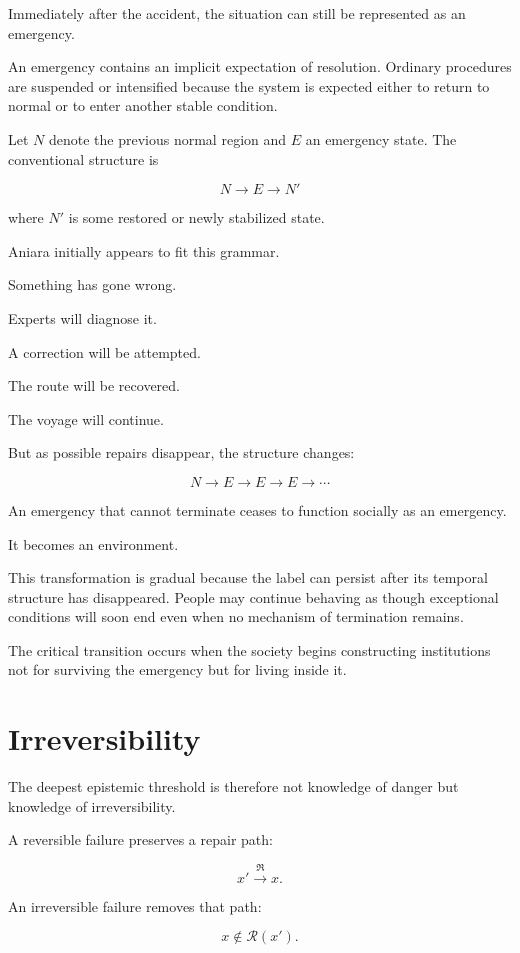 \documentclass[11pt,oneside]{book}
\theoremstyle{definition}
\theoremstyle{remark}
\newcommand{\R}{\mathcal{R}}
\newcommand{\Repair}{\mathfrak{R}}
\begin{document}
Immediately after the accident, the situation can still be represented as an emergency.

An emergency contains an implicit expectation of resolution. Ordinary procedures are suspended or intensified because the system is expected either to return to normal or to enter another stable condition.

Let \(N\) denote the previous normal region and \(E\) an emergency state. The conventional structure is

\[
N
\rightarrow
E
\rightarrow
N'
\]

where \(N'\) is some restored or newly stabilized state.

Aniara initially appears to fit this grammar.

Something has gone wrong.

Experts will diagnose it.

A correction will be attempted.

The route will be recovered.

The voyage will continue.

But as possible repairs disappear, the structure changes:

\[
N
\rightarrow
E
\rightarrow
E
\rightarrow
E
\rightarrow\cdots
\]

An emergency that cannot terminate ceases to function socially as an emergency.

It becomes an environment.

This transformation is gradual because the label can persist after its temporal structure has disappeared. People may continue behaving as though exceptional conditions will soon end even when no mechanism of termination remains.

The critical transition occurs when the society begins constructing institutions not for surviving the emergency but for living inside it.

\section{Irreversibility}

The deepest epistemic threshold is therefore not knowledge of danger but knowledge of irreversibility.

A reversible failure preserves a repair path:

\[
x'
\xrightarrow{\Repair}
x.
\]

An irreversible failure removes that path:

\[
x\notin\R(x').
\]
\end{document}
